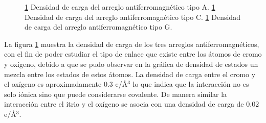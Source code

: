 
\begin{figure}[H]
	\centering
	\singlespace
	\caption[Densidades de carga del $YCrO_{3}$ con arreglos 
	antiferromagn\'eticos tipo A,C y G]{\ref{yco_DC}  Densidad 
	de carga del arreglo 
	antiferromagn\'etico tipo A. \ref{yco_DC}   Densidad de 
	carga del arreglo 
	antiferromagn\'etico tipo C. \ref{yco_DC}   Densidad de 
	carga del arreglo 
	antiferromagn\'etico tipo G.}
	\label{yco_DC}
\end{figure}

La figura \ref{yco_DC} muestra la densidad de carga de los tres arreglos 
antiferromagn\'eticos, con el fin de poder estudiar el tipo de enlace que 
existe entre los \'atomos de cromo y ox\'igeno, debido a que se pudo observar 
en la gr\'afica de densidad de estados un mezcla entre los estados de estos 
\'atomos. La densidad de carga entre el cromo y el ox\'igeno es 
aproximadamente $0.3$ e/\AA$^{3}$ lo que indica que la interacci\'on no es 
solo i\'onica sino que puede considerarse covalente. De manera similar la 
interacci\'on entre el itrio y el ox\'igeno se asocia con una densidad de carga 
de $0.02$ e/\AA$^{3}$.

